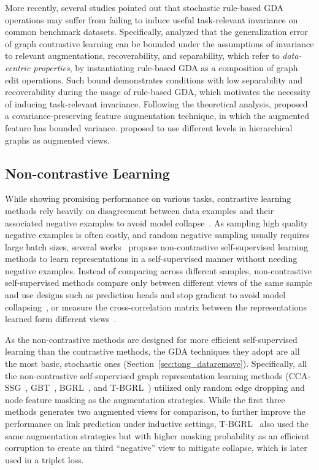 \documentclass[11pt]{article}
\begin{document}
More recently, several studies \cite{suresh2021adversarial, trivedianalyzing,liu2023data} pointed out that stochastic rule-based GDA operations may suffer from failing to induce useful task-relevant invariance on common benchmark datasets. Specifically, \citet{trivedianalyzing} analyzed that the generalization error of graph contrastive learning can be bounded under the assumptions of invariance to relevant augmentations, recoverability, and separability, which refer to \textit{data-centric properties}, by instantiating rule-based GDA as a composition of graph edit operations. Such bound demonstrates conditions with low separability and recoverability during the usage of rule-based GDA, which motivates the necessity of inducing task-relevant invariance. 
Following the theoretical analysis, \citet{zhang2022costa} proposed a covariance-preserving feature augmentation technique, in which the augmented feature has bounded variance. \citet{wang2021multi} proposed to use different levels in hierarchical graphs as augmented views.

\subsection{Non-contrastive Learning}
\label{sec:tong_noncontrastive}
While showing promising performance on various tasks, contrastive learning methods rely heavily on disagreement between data examples and their associated negative examples to avoid model collapse~\cite{grill2020bootstrap}. As sampling high quality negative examples is often costly, and random negative sampling usually requires large batch sizes, several works~\cite{grill2020bootstrap,zbontar2021barlow,balestriero2022contrastive} propose non-contrastive self-supervised learning methods to learn representations in a self-supervised manner without needing negative examples. Instead of comparing across different samples, non-contrastive self-supervised methods compare only between different views of the same sample and use designs such as prediction heads and stop gradient to avoid model collapsing~\cite{grill2020bootstrap}, or measure the cross-correlation matrix between the representations learned form different views~\cite{zbontar2021barlow}.

As the non-contrastive methods are designed for more efficient self-supervised learning than the contrastive methods, the GDA techniques they adopt are all the most basic, stochastic ones (Section~\ref{sec:tong_dataremove}). Specifically, all the non-contrastive self-supervised graph representation learning methods (CCA-SSG~\cite{zhang2021canonical}, GBT~\cite{bielak2022graph}, BGRL~\cite{thakoor2022largescale}, and T-BGRL~\cite{shiao2022link}) utilized only random edge dropping and node feature masking as the augmentation strategies. 
While the first three methods generates two augmented views for comparison, to further improve the performance on link prediction under inductive settings, T-BGRL~\cite{shiao2022link} also used the same augmentation strategies but with higher masking probability as an efficient corruption to create an third ``negative'' view to mitigate collapse, which is later used in a triplet loss.
\end{document}
